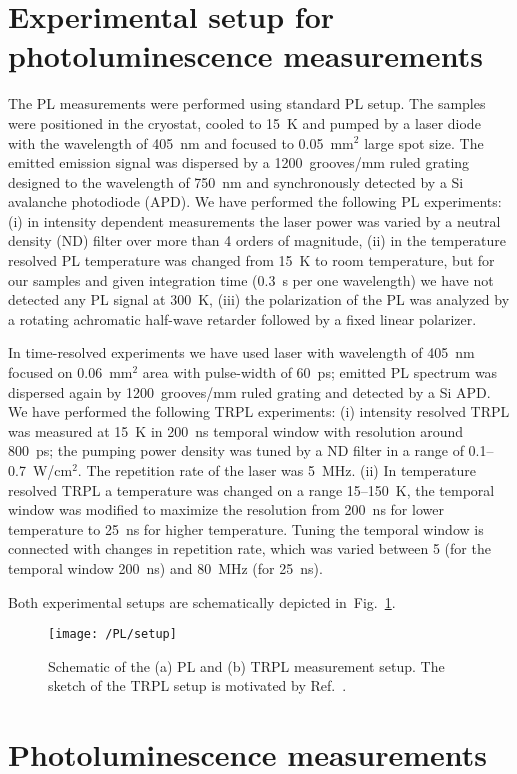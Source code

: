 \section{Experimental setup for photoluminescence measurements}
The PL measurements were performed using standard PL setup. The samples were positioned in the cryostat, cooled to 15~K and pumped by a laser diode with the wavelength of 405~nm and focused to 0.05~mm$^2$ large spot size. The emitted emission signal was dispersed by a 1200~grooves/mm ruled grating designed to the wavelength of 750~nm and synchronously detected by a Si avalanche photodiode (APD). We have performed the following PL experiments: (i) in intensity dependent measurements the laser power was varied by a neutral density (ND) filter over more than 4 orders of magnitude, (ii) in the temperature resolved PL temperature was changed from 15~K to room temperature, but for our samples and given integration time (0.3~s per one wavelength) we have not detected any PL signal at 300~K, (iii) the polarization of the PL was analyzed by a rotating achromatic half-wave retarder followed by a fixed linear polarizer.

In time-resolved experiments we have used laser with wavelength of 405~nm focused on 0.06~mm$^2$ area with pulse-width of 60~ps; emitted PL spectrum was dispersed again by 1200~grooves/mm ruled grating and detected by a Si APD. We have performed the following TRPL experiments: (i) intensity resolved TRPL was measured at 15~K in 200~ns temporal window with resolution around 800~ps; the pumping power density was tuned by a ND filter in a range of 0.1--0.7~W/cm$^2$. The repetition rate of the laser was 5~MHz. (ii) In temperature resolved TRPL a temperature was changed on a range 15--150~K, the temporal window was modified to maximize the resolution from 200~ns for lower temperature to 25~ns for higher temperature. Tuning the temporal window is connected with changes in repetition rate, which was varied between 5 (for the temporal window 200~ns) and 80~MHz (for 25~ns).

Both experimental setups are schematically depicted in~Fig.~\ref{fig:Madrid_setup}.
\begin{figure}
	\centering
	\texttt{[image: /PL/setup]}
	\caption{Schematic of the (a) PL and (b) TRPL measurement setup. The sketch of the TRPL setup is motivated by Ref.~\citep{TRPL_setup}.}
	\label{fig:Madrid_setup}
\end{figure}


\newpage
\section{Photoluminescence measurements}

